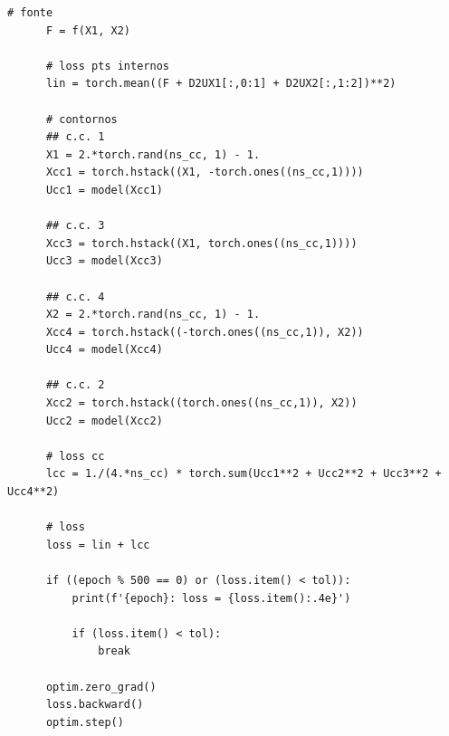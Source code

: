 \begin{lstlisting}[caption=py\_pinn\_poisson]
      # fonte
      F = f(X1, X2)
      
      # loss pts internos
      lin = torch.mean((F + D2UX1[:,0:1] + D2UX2[:,1:2])**2)
      
      # contornos
      ## c.c. 1
      X1 = 2.*torch.rand(ns_cc, 1) - 1.
      Xcc1 = torch.hstack((X1, -torch.ones((ns_cc,1))))
      Ucc1 = model(Xcc1)
      
      ## c.c. 3
      Xcc3 = torch.hstack((X1, torch.ones((ns_cc,1))))
      Ucc3 = model(Xcc3)
      
      ## c.c. 4
      X2 = 2.*torch.rand(ns_cc, 1) - 1.
      Xcc4 = torch.hstack((-torch.ones((ns_cc,1)), X2))
      Ucc4 = model(Xcc4)
      
      ## c.c. 2
      Xcc2 = torch.hstack((torch.ones((ns_cc,1)), X2))
      Ucc2 = model(Xcc2)
      
      # loss cc
      lcc = 1./(4.*ns_cc) * torch.sum(Ucc1**2 + Ucc2**2 + Ucc3**2 + Ucc4**2)
      
      # loss
      loss = lin + lcc
      
      if ((epoch % 500 == 0) or (loss.item() < tol)):
          print(f'{epoch}: loss = {loss.item():.4e}')        
  
          if (loss.item() < tol):
              break
      
      optim.zero_grad()
      loss.backward()
      optim.step()
\end{lstlisting}



